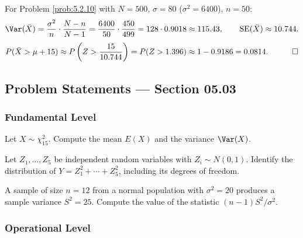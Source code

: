 \begin{solucion}
	\label{sol:5.2.10}
	For Problem \ref{prob:5.2.10} with $N=500$, $\sigma=80$ ($\sigma^2=6400$), $n=50$:
	\begin{align*}
		\Var(\bar X) = \frac{\sigma^2}{n}\cdot\frac{N-n}{N-1} = \frac{6400}{50}\cdot\frac{450}{499} = 128\cdot 0.9018 \approx 115.43, \qquad \text{SE}(\bar X) \approx 10.744.
	\end{align*}
	\begin{align*}
		P(\bar X > \mu+15) \approx P\left(Z > \frac{15}{10.744}\right) = P(Z > 1.396) \approx 1-0.9186 = 0.0814. \quad \qedhere
	\end{align*}
\end{solucion}


\subsection*{Problem Statements --- Section 05.03}

\subsubsection*{Fundamental Level}

\begin{problema}
	\label{prob:5.3.1}
	Let $X \sim \chi^2_{15}$. Compute the mean $E(X)$ and the variance $\Var(X)$.
\end{problema}

\begin{problema}
	\label{prob:5.3.2}
	Let $Z_1, \ldots, Z_5$ be independent random variables with $Z_i \sim N(0,1)$. Identify the distribution of $Y = Z_1^2+\cdots+Z_5^2$, including its degrees of freedom.
\end{problema}

\begin{problema}
	\label{prob:5.3.3}
	A sample of size $n=12$ from a normal population with $\sigma^2=20$ produces a sample variance $S^2=25$. Compute the value of the statistic $(n-1)S^2/\sigma^2$.
\end{problema}

\subsubsection*{Operational Level}

